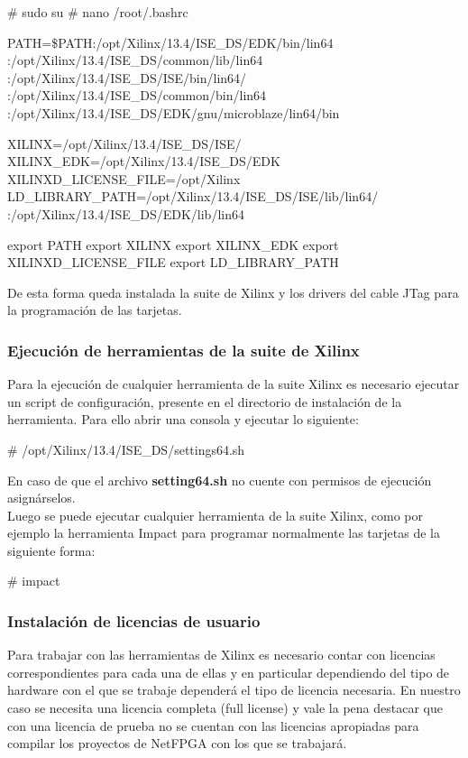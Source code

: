 \begin{bash}
# sudo su
# nano /root/.bashrc

PATH=\$PATH:/opt/Xilinx/13.4/ISE_DS/EDK/bin/lin64
:/opt/Xilinx/13.4/ISE_DS/common/lib/lin64
:/opt/Xilinx/13.4/ISE_DS/ISE/bin/lin64/
:/opt/Xilinx/13.4/ISE_DS/common/bin/lin64
:/opt/Xilinx/13.4/ISE_DS/EDK/gnu/microblaze/lin64/bin

XILINX=/opt/Xilinx/13.4/ISE_DS/ISE/
XILINX_EDK=/opt/Xilinx/13.4/ISE_DS/EDK
XILINXD_LICENSE_FILE=/opt/Xilinx
LD_LIBRARY_PATH=/opt/Xilinx/13.4/ISE_DS/ISE/lib/lin64/
:/opt/Xilinx/13.4/ISE_DS/EDK/lib/lin64

export PATH
export XILINX
export XILINX_EDK
export XILINXD_LICENSE_FILE
export LD_LIBRARY_PATH
\end{bash}

De esta forma queda instalada la suite de Xilinx y los drivers del cable JTag para la programación de las tarjetas.

\subsubsection{Ejecución de herramientas de la suite de Xilinx}
Para la ejecución de cualquier herramienta de la suite Xilinx es necesario ejecutar un script de configuración, presente en el directorio de instalación de la herramienta. Para ello abrir una consola y ejecutar lo siguiente:\\

\begin{bash}
# /opt/Xilinx/13.4/ISE_DS/settings64.sh
\end{bash}

En caso de que el archivo \textbf{setting64.sh} no cuente con permisos de ejecución asignárselos.\\ 

Luego se puede ejecutar cualquier herramienta de la suite Xilinx, como por ejemplo la herramienta Impact para programar normalmente las tarjetas de la siguiente forma:\\

\begin{bash}
# impact
\end{bash}

\subsubsection{Instalación de licencias de usuario}
Para trabajar con las herramientas de Xilinx es necesario contar con licencias correspondientes para cada una de ellas y en particular dependiendo del tipo de hardware con el que se trabaje dependerá el tipo de licencia necesaria. En nuestro caso se necesita una licencia completa (full license) y vale la pena destacar que con una licencia de prueba no se cuentan con las licencias apropiadas para compilar los proyectos de NetFPGA con los que se trabajar\'a.\\

